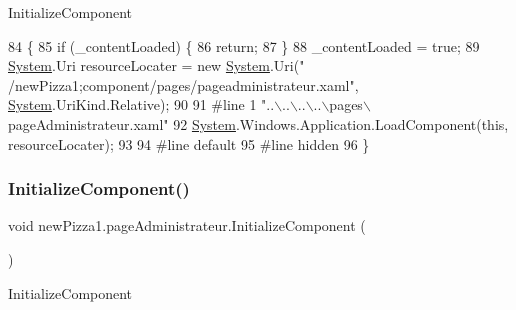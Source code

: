 Initialize\+Component 


\begin{DoxyCode}
84                                           \{
85             \textcolor{keywordflow}{if} (\_contentLoaded) \{
86                 \textcolor{keywordflow}{return};
87             \}
88             \_contentLoaded = \textcolor{keyword}{true};
89             \hyperlink{namespaceSystem}{System}.Uri resourceLocater = \textcolor{keyword}{new} \hyperlink{namespaceSystem}{System}.Uri(\textcolor{stringliteral}{"
      /newPizza1;component/pages/pageadministrateur.xaml"}, \hyperlink{namespaceSystem}{System}.UriKind.Relative);
90             
91 \textcolor{preprocessor}{            #line 1 "..\(\backslash\)..\(\backslash\)..\(\backslash\)..\(\backslash\)pages\(\backslash\)pageAdministrateur.xaml"
}
92             \hyperlink{namespaceSystem}{System}.Windows.Application.LoadComponent(\textcolor{keyword}{this}, resourceLocater);
93             
94 \textcolor{preprocessor}{            #line default
}
95 \textcolor{preprocessor}{            #line hidden
}
96         \}
\end{DoxyCode}
\mbox{\label{classnewPizza1_1_1pageAdministrateur_a8ce68fc7fc92670f56ef3dabb906c9d0}} 
\subsubsection{\texorpdfstring{Initialize\+Component()}{InitializeComponent()}\hspace{0.1cm}{\footnotesize\ttfamily [3/3]}}
{\footnotesize\ttfamily void new\+Pizza1.\+page\+Administrateur.\+Initialize\+Component (\begin{DoxyParamCaption}{ }\end{DoxyParamCaption})\hspace{0.3cm}{\ttfamily [inline]}}



Initialize\+Component 


